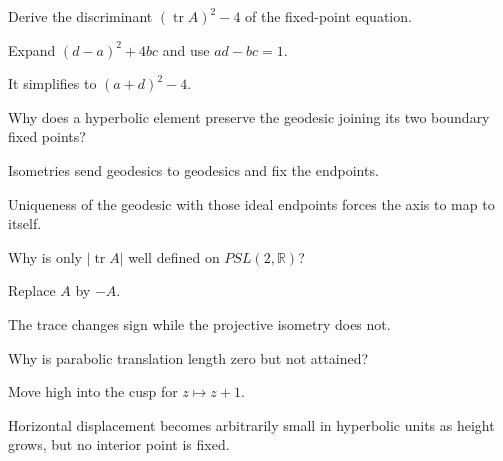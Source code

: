 \begin{exercise}\label{exr:vii34-ped-06}
Derive the discriminant \((\operatorname{tr}A)^2-4\) of the fixed-point equation.
\end{exercise}

\begin{hint}
Expand \((d-a)^2+4bc\) and use \(ad-bc=1\).
\end{hint}

\begin{solution}
It simplifies to \((a+d)^2-4\).
\end{solution}

\begin{exercise}\label{exr:vii34-ped-07}
Why does a hyperbolic element preserve the geodesic joining its two boundary fixed points?
\end{exercise}

\begin{hint}
Isometries send geodesics to geodesics and fix the endpoints.
\end{hint}

\begin{solution}
Uniqueness of the geodesic with those ideal endpoints forces the axis to map to itself.
\end{solution}

\begin{exercise}\label{exr:vii34-ped-08}
Why is only \(|\operatorname{tr}A|\) well defined on \(PSL(2,\mathbb R)\)?
\end{exercise}

\begin{hint}
Replace \(A\) by \(-A\).
\end{hint}

\begin{solution}
The trace changes sign while the projective isometry does not.
\end{solution}

\begin{exercise}\label{exr:vii34-ped-09}
Why is parabolic translation length zero but not attained?
\end{exercise}

\begin{hint}
Move high into the cusp for \(z\mapsto z+1\).
\end{hint}

\begin{solution}
Horizontal displacement becomes arbitrarily small in hyperbolic units as height grows, but no interior point is fixed.
\end{solution}

